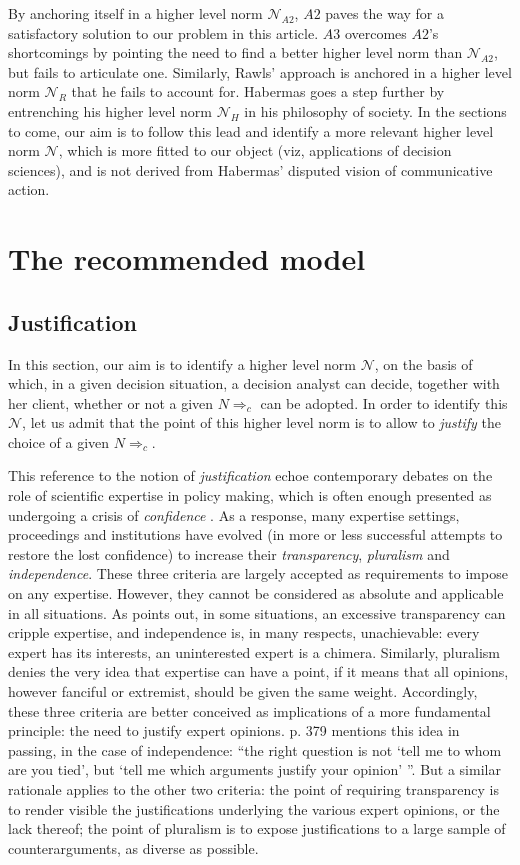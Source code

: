 \documentclass[preprint, french, english, 11pt, authoryear]{elsarticle}%
\newcommand{\adv}{\mathscr{N}}
\begin{document}
By anchoring itself in a higher level norm $\mathscr{N}_{A2}$, $A2$ paves the way for a satisfactory solution to our problem in this article. $A3$ overcomes $A2$'s shortcomings by pointing the need to find a better higher level norm than $\mathscr{N}_{A2}$, but fails to articulate one. Similarly, Rawls' approach is anchored in a higher level norm $\mathscr{N}_{R}$ that he fails to account for. Habermas goes a step further by entrenching his higher level norm $\mathscr{N}_{H}$ in his philosophy of society. In the sections to come, our aim is to follow this lead and identify a more relevant higher level norm $\adv$, which is more fitted to our object (viz, applications of decision sciences), and is not derived from Habermas' disputed vision of communicative action.

\section{The recommended model}
\subsection{Justification}
In this section, our aim is to identify a higher level norm $\adv$, on the basis of which, in a given decision situation, a decision analyst can decide, together with her client, whether or not a given $N⇒_c$ can be adopted. In order to identify this $\adv$, let us admit that the point of this higher level norm is to allow to \emph{justify} the choice of a given $N⇒_c$.

This reference to the notion of \emph{justification} echoe contemporary debates on the role of scientific expertise in policy making, which is often enough presented as undergoing a crisis of \emph{confidence} \citep{godard_environnement_2015}. As a response, many expertise settings, proceedings and institutions have evolved (in more or less successful attempts to restore the lost confidence) to increase their \emph{transparency}, \emph{pluralism} and \emph{independence}. These three criteria are largely accepted as requirements to impose on any expertise. However, they cannot be considered as absolute and applicable in all situations. As \citet{godard_environnement_2015} points out, in some situations, an excessive transparency can cripple expertise, and independence is, in many respects, unachievable: every expert has its interests, an uninterested expert is a chimera. Similarly, pluralism denies the very idea that expertise can have a point, if it means that all opinions, however fanciful or extremist, should be given the same weight. Accordingly, these three criteria are better conceived as implications of a more fundamental principle: the need to justify expert opinions. \citet{godard_environnement_2015} p. 379 mentions this idea in passing, in the case of independence: “the right question is not `tell me to whom are you tied', but `tell me which arguments justify your opinion' ”. But a similar rationale applies to the other two criteria: the point of requiring transparency is to render visible the justifications underlying the various expert opinions, or the lack thereof; the point of pluralism is to expose justifications to a large sample of counterarguments, as diverse as possible.
\end{document}

